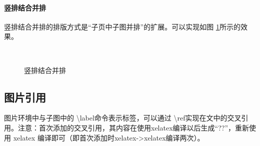 \documentclass[AutoFakeBold]{ZafuThesis}
\begin{document}
\paragraph{竖排结合并排}
竖排结合并排的排版方式是“子页中子图并排”的扩展。可以实现如图 \ref{figure_竖排结合并排}所示的效果。
\begin{figure}[htbp]
  \centering
  \begin{minipage}[b]{0.45\columnwidth}
    \centering
    \\
  \end{minipage}
  \begin{minipage}[b]{0.45\columnwidth}
    \centering
  \end{minipage}
  \caption{竖排结合并排}
  \label{figure_竖排结合并排}
\end{figure}

\subsection{图片引用}
图片环境中与子图中的 \textbackslash label命令表示标签，可以通过 \textbackslash ref实现在文中的交叉引用。注意：首次添加的交叉引用，其内容在使用xelatex编译以后生成“??”，重新使用 xelatex 编译即可（即首次添加时xelatex->xelatex编译两次）。
\end{document}
